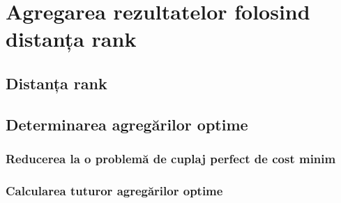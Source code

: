 \chapter{Agregarea rezultatelor folosind distanța rank}
\section{Distanța rank}
\section{Determinarea agregărilor optime}
\subsection{Reducerea la o problemă de cuplaj perfect de cost minim}
\subsection{Calcularea tuturor agregărilor optime}
